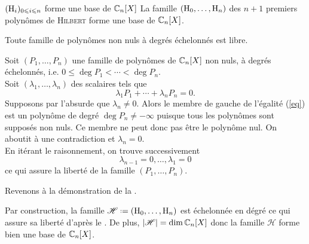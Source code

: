 \begin{prop}{$(\mathrm{H}_i)_{0 \leqslant i \leqslant n}$ forme une base de $\mathbb{C}_n[X]$} 
    La famille $(\mathrm{H}_0, \dots, \mathrm{H}_n)$ des $n+1$ premiers polynômes de \textsc{Hilbert} forme une base de $\mathbb{C}_n[X]$.
\end{prop}

\begin{lemme} 
    Toute famille de polynômes non nuls à degrés échelonnés est libre.
\end{lemme}

\begin{preuve}
    Soit $(P_1, \dots, P_n)$ une famille de polynômes de $\mathbb{C}_n[X]$ non nuls, à degrés échelonnés, i.e. $0 \leqslant \deg P_1 < \cdots < \deg P_n$. \\
    Soit $(\lambda_1, \dots, \lambda_n)$ des scalaires tels que
    \begin{equation}\tag{\star} \label{eq}
        \lambda_1 P_1 + \cdots + \lambda_n P_n = 0.
    \end{equation}
    Supposons par l'absurde que $\lambda_n \not= 0$. Alors le membre de gauche de l'égalité (\ref{eq}) est un polynôme de degré $\deg P_n \not= - \infty$ puisque tous les polynômes sont supposés non nuls. Ce membre ne peut donc pas être le polynôme nul. On aboutit à une contradiction et $\lambda_n = 0$. \\ 
    En itérant le raisonnement, on trouve successivement 
    $$\lambda_{n-1} = 0, \dots, \lambda_1 = 0$$
    ce qui assure la liberté de la famille $(P_1, \dots, P_n)$.
\end{preuve}


Revenons à la démonstration de la .

\begin{preuve}
    Par construction, la famille $\mathscr{H} \defeq (\Hilb_0, \dots, \Hilb_n)$ est échelonnée en dégré \note ce qui assure sa liberté d'après le . De plus, $|\mathscr{H}| = \dim \mathbb{C}_n[X]$ donc la famille $\mathscr{H}$ forme bien une base de $\mathbb{C}_n[X]$.
\end{preuve}